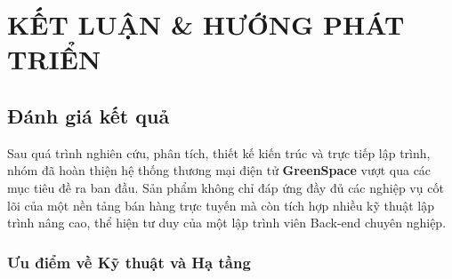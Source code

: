 \documentclass[11pt, a4paper]{article}
\let\oldsection\section
\renewcommand{\section}{\FloatBarrier\oldsection}
\begin{document}
\newpage
\section{KẾT LUẬN \& HƯỚNG PHÁT TRIỂN}

\subsection{Đánh giá kết quả}

Sau quá trình nghiên cứu, phân tích, thiết kế kiến trúc và trực tiếp lập trình,
nhóm đã hoàn thiện hệ thống thương mại điện tử \textbf{GreenSpace} vượt qua các
mục tiêu đề ra ban đầu. Sản phẩm không chỉ đáp ứng đầy đủ các nghiệp vụ cốt lõi
của một nền tảng bán hàng trực tuyến mà còn tích hợp nhiều kỹ thuật lập trình
nâng cao, thể hiện tư duy của một lập trình viên Back-end chuyên nghiệp.

\subsubsection{Ưu điểm về Kỹ thuật và Hạ tầng}
\end{document}

